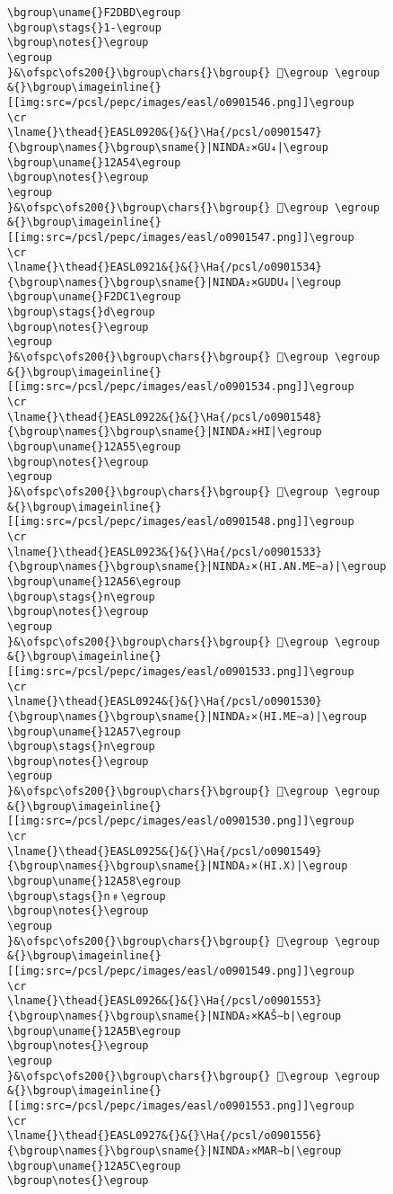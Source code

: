 \begin{verbatim}
\bgroup\uname{}F2DBD\egroup
\bgroup\stags{}1-\egroup
\bgroup\notes{}\egroup
\egroup
}&\ofspc\ofs200{}\bgroup\chars{}\bgroup{} 󲶽\egroup \egroup
&{}\bgroup\imageinline{}[[img:src=/pcsl/pepc/images/easl/o0901546.png]]\egroup
\cr
\lname{}\thead{}EASL0920&{}&{}\Ha{/pcsl/o0901547}{\bgroup\names{}\bgroup\sname{}|NINDA₂×GU₄|\egroup
\bgroup\uname{}12A54\egroup
\bgroup\notes{}\egroup
\egroup
}&\ofspc\ofs200{}\bgroup\chars{}\bgroup{} 𒩔\egroup \egroup
&{}\bgroup\imageinline{}[[img:src=/pcsl/pepc/images/easl/o0901547.png]]\egroup
\cr
\lname{}\thead{}EASL0921&{}&{}\Ha{/pcsl/o0901534}{\bgroup\names{}\bgroup\sname{}|NINDA₂×GUDU₄|\egroup
\bgroup\uname{}F2DC1\egroup
\bgroup\stags{}d\egroup
\bgroup\notes{}\egroup
\egroup
}&\ofspc\ofs200{}\bgroup\chars{}\bgroup{} 󲷁\egroup \egroup
&{}\bgroup\imageinline{}[[img:src=/pcsl/pepc/images/easl/o0901534.png]]\egroup
\cr
\lname{}\thead{}EASL0922&{}&{}\Ha{/pcsl/o0901548}{\bgroup\names{}\bgroup\sname{}|NINDA₂×HI|\egroup
\bgroup\uname{}12A55\egroup
\bgroup\notes{}\egroup
\egroup
}&\ofspc\ofs200{}\bgroup\chars{}\bgroup{} 𒩕\egroup \egroup
&{}\bgroup\imageinline{}[[img:src=/pcsl/pepc/images/easl/o0901548.png]]\egroup
\cr
\lname{}\thead{}EASL0923&{}&{}\Ha{/pcsl/o0901533}{\bgroup\names{}\bgroup\sname{}|NINDA₂×(HI.AN.ME∼a)|\egroup
\bgroup\uname{}12A56\egroup
\bgroup\stags{}n\egroup
\bgroup\notes{}\egroup
\egroup
}&\ofspc\ofs200{}\bgroup\chars{}\bgroup{} 𒩖\egroup \egroup
&{}\bgroup\imageinline{}[[img:src=/pcsl/pepc/images/easl/o0901533.png]]\egroup
\cr
\lname{}\thead{}EASL0924&{}&{}\Ha{/pcsl/o0901530}{\bgroup\names{}\bgroup\sname{}|NINDA₂×(HI.ME∼a)|\egroup
\bgroup\uname{}12A57\egroup
\bgroup\stags{}n\egroup
\bgroup\notes{}\egroup
\egroup
}&\ofspc\ofs200{}\bgroup\chars{}\bgroup{} 𒩗\egroup \egroup
&{}\bgroup\imageinline{}[[img:src=/pcsl/pepc/images/easl/o0901530.png]]\egroup
\cr
\lname{}\thead{}EASL0925&{}&{}\Ha{/pcsl/o0901549}{\bgroup\names{}\bgroup\sname{}|NINDA₂×(HI.X)|\egroup
\bgroup\uname{}12A58\egroup
\bgroup\stags{}n﹟\egroup
\bgroup\notes{}\egroup
\egroup
}&\ofspc\ofs200{}\bgroup\chars{}\bgroup{} 𒩘\egroup \egroup
&{}\bgroup\imageinline{}[[img:src=/pcsl/pepc/images/easl/o0901549.png]]\egroup
\cr
\lname{}\thead{}EASL0926&{}&{}\Ha{/pcsl/o0901553}{\bgroup\names{}\bgroup\sname{}|NINDA₂×KAŠ∼b|\egroup
\bgroup\uname{}12A5B\egroup
\bgroup\notes{}\egroup
\egroup
}&\ofspc\ofs200{}\bgroup\chars{}\bgroup{} 𒩛\egroup \egroup
&{}\bgroup\imageinline{}[[img:src=/pcsl/pepc/images/easl/o0901553.png]]\egroup
\cr
\lname{}\thead{}EASL0927&{}&{}\Ha{/pcsl/o0901556}{\bgroup\names{}\bgroup\sname{}|NINDA₂×MAR∼b|\egroup
\bgroup\uname{}12A5C\egroup
\bgroup\notes{}\egroup

\end{verbatim}
